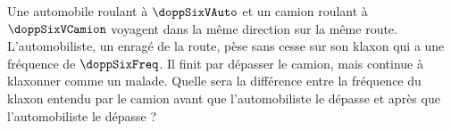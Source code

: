 Une automobile roulant à $\doppSixVAuto$ et un camion roulant à $\doppSixVCamion$ voyagent dans la même direction sur la même route. L’automobiliste, un enragé de la route, pèse sans cesse sur son klaxon qui a une fréquence de $\doppSixFreq$. Il finit par dépasser le camion, mais continue à klaxonner comme un malade. Quelle sera la différence entre la fréquence du klaxon entendu par le camion avant que l’automobiliste le dépasse et après que l’automobiliste le dépasse ?